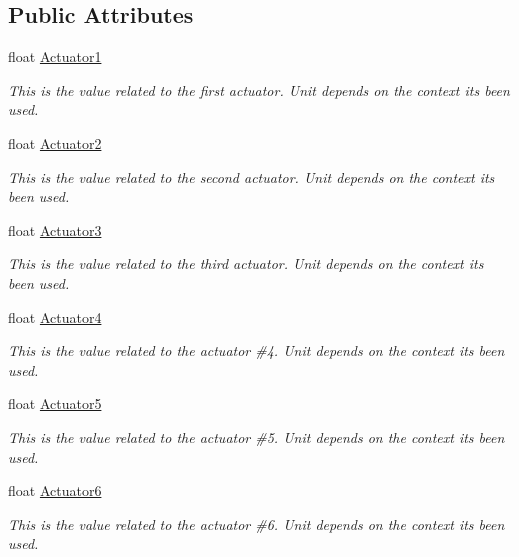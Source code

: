 \subsection*{Public Attributes}
\begin{DoxyCompactItemize}
\item 
float \hyperlink{structAngularInfo_a5fc555c085bddc82c33a3039fbc40932}{Actuator1}
\begin{DoxyCompactList}\small\item\em This is the value related to the first actuator. Unit depends on the context it\textquotesingle{}s been used. \end{DoxyCompactList}\item 
float \hyperlink{structAngularInfo_ab7b9349eef239f9741d9c28a795e4c35}{Actuator2}
\begin{DoxyCompactList}\small\item\em This is the value related to the second actuator. Unit depends on the context it\textquotesingle{}s been used. \end{DoxyCompactList}\item 
float \hyperlink{structAngularInfo_a30426eab94c82cfd3d697bbc8c506c2a}{Actuator3}
\begin{DoxyCompactList}\small\item\em This is the value related to the third actuator. Unit depends on the context it\textquotesingle{}s been used. \end{DoxyCompactList}\item 
float \hyperlink{structAngularInfo_a46a1314c4846de6a495310b44fe5e0c3}{Actuator4}
\begin{DoxyCompactList}\small\item\em This is the value related to the actuator \#4. Unit depends on the context it\textquotesingle{}s been used. \end{DoxyCompactList}\item 
float \hyperlink{structAngularInfo_a953c29d2481eb1c42c84e9c992d34dde}{Actuator5}
\begin{DoxyCompactList}\small\item\em This is the value related to the actuator \#5. Unit depends on the context it\textquotesingle{}s been used. \end{DoxyCompactList}\item 
float \hyperlink{structAngularInfo_ab54771129d8a9e451c27942dd349340d}{Actuator6}
\begin{DoxyCompactList}\small\item\em This is the value related to the actuator \#6. Unit depends on the context it\textquotesingle{}s been used. \end{DoxyCompactList}\end{DoxyCompactItemize}


